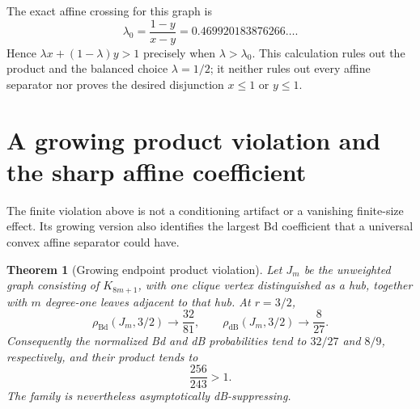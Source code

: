 \documentclass[11pt]{article}
\newtheorem{theorem}{Theorem}
\theoremstyle{definition}
\theoremstyle{remark}
\newcommand{\Bd}{\mathrm{Bd}}
\newcommand{\dB}{\mathrm{dB}}
\begin{document}
The exact affine crossing for this graph is
\[
 \lambda_0=\frac{1-y}{x-y}=0.469920183876266\ldots.
\]
Hence $\lambda x+(1-\lambda)y>1$ precisely when
$\lambda>\lambda_0$.  This calculation rules out the product and the
balanced choice $\lambda=1/2$; it neither rules out every affine separator
nor proves the desired disjunction $x\leq1$ or $y\leq1$.

\section{A growing product violation and the sharp affine coefficient}
\label{sec:affine-sharpness}

The finite violation above is not a conditioning artifact or a vanishing
finite-size effect.  Its growing version also identifies the largest Bd
coefficient that a universal convex affine separator could have.

\begin{theorem}[Growing endpoint product violation]
\label{thm:growing-product}
Let $J_m$ be the unweighted graph consisting of $K_{8m+1}$, with one clique
vertex distinguished as a hub, together with $m$ degree-one leaves adjacent
to that hub.  At $r=3/2$,
\[
 \rho_{\Bd}(J_m,3/2)\longrightarrow\frac{32}{81},\qquad
 \rho_{\dB}(J_m,3/2)\longrightarrow\frac{8}{27}.
\]
Consequently the normalized Bd and dB probabilities tend to $32/27$ and
$8/9$, respectively, and their product tends to
\[
                         \frac{256}{243}>1.
\]
The family is nevertheless asymptotically dB-suppressing.
\end{theorem}
\end{document}
